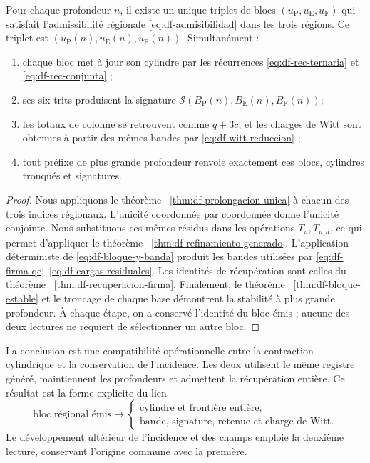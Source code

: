 \begin{theorem}
\label{thm:df-composicion-conjunta}
Pour chaque profondeur \(n\), il existe un unique triplet de blocs
\((u_{\mathrm P},u_{\mathrm E},u_{\mathrm F})\) qui satisfait
l'admissibilité régionale \eqref{eq:df-admisibilidad} dans les trois régions.
Ce triplet est \((u_{\mathrm P}(n),u_{\mathrm E}(n),u_{\mathrm F}(n))\).
Simultanément :
\begin{enumerate}
\item chaque bloc met à jour son cylindre par les récurrences
\eqref{eq:df-rec-ternaria} et \eqref{eq:df-rec-conjunta} ;
\item ses six trits produisent la signature
\(\mathcal S(B_{\mathrm P}(n),B_{\mathrm E}(n),B_{\mathrm F}(n))\);
\item les totaux de colonne se retrouvent comme \(q+3c\), et les charges de Witt sont obtenues à partir des mêmes bandes par
\eqref{eq:df-witt-reduccion} ;
\item tout préfixe de plus grande profondeur renvoie exactement ces
blocs, cylindres tronqués et signatures.
\end{enumerate}
\end{theorem}

\begin{proof}
Nous appliquons le théorème ~\ref{thm:df-prolongacion-unica} à chacun des trois
indices régionaux. L'unicité coordonnée par coordonnée donne l'unicité
conjointe. Nous substituons ces mêmes résidus dans les opérations
\(T_u,T_{u,d}\), ce qui permet d'appliquer le
théorème ~\ref{thm:df-refinamiento-generado}. L'application déterministe de
\eqref{eq:df-bloque-y-banda} produit les bandes utilisées par
\eqref{eq:df-firma-qc}--\eqref{eq:df-cargas-residuales}. Les identités
de récupération sont celles du théorème ~\ref{thm:df-recuperacion-firma}.
Finalement, le théorème ~\ref{thm:df-bloque-estable} et le troncage de
chaque base démontrent la stabilité à plus grande profondeur. À chaque étape, on a conservé l'identité du bloc émis ; aucune des deux
lectures ne requiert de sélectionner un autre bloc.
\end{proof}

La conclusion est une compatibilité opérationnelle entre la contraction
cylindrique et la conservation de l'incidence. Les deux utilisent le même
registre généré, maintiennent les profondeurs et admettent la récupération
entière. Ce résultat est la forme explicite du lien
\[
 \text{bloc régional émis}
 \longrightarrow
 \begin{cases}
 \text{cylindre et frontière entière},\\
 \text{bande, signature, retenue et charge de Witt}.
 \end{cases}
\]
Le développement ultérieur de l'incidence et des champs emploie la deuxième lecture, conservant l'origine commune avec la première.


